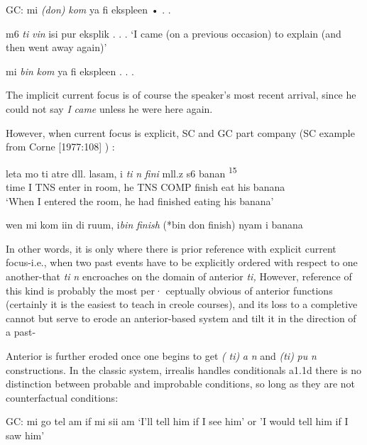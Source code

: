 \ea\label{ex:2:107}
 GC: mi \textit{(don)} \textit{k}\textit{om} ya fi ekspleen • . .
\glt
\z

\ea\label{ex:2:108}
 m6 \textit{ti} \textit{vin} isi pur eksplik . . .
\glt `I came (on a previous occasion) to explain (and then went away again)'
\z



\ea\label{ex:2:109}
 mi \textit{bin} \textit{kom} ya fi ekspleen . . .
\glt
\z

The implicit current focus is of course the speaker's most recent arrival, since he could not say \textit{I} \textit{came} unless he were here again.

However, when current focus is explicit, SC and GC part com\-pany (SC example from Corne [1977:108] ) :

\ea\label{ex:2:110}
\gll leta mo ti atre dll. lasam, i \textit{ti} \textit{n} \textit{fini }mll.z s6 banan \textsuperscript{15}\\
time I TNS enter in room, he TNS COMP finish eat his banana \\
\glt `When I entered the room, he had finished eating his banana'
\z

\ea\label{ex:2:111}
 wen mi kom iin di ruum, i\textit{bin} \textit{finish }(*bin don finish) nyam i banana\\
\z



In other words, it is only where there is prior reference with explicit current focus-i.e., when two past events have to be explicitly ordered with respect to one another-that \textit{ti} \textit{n} encroaches on the domain of anterior \textit{ti,} However, reference of this kind is probably the most per· ceptually obvious of anterior functions (certainly it is the easiest to teach in creole courses), and its loss to a completive cannot but serve
to erode an anterior-based system and tilt it in the direction of a past-


Anterior is further eroded once one begins to get \textit{(} \textit{ti)} \textit{a} \textit{n} and \textit{(ti)} \textit{pu} \textit{n} constructions. In the classic system, irrealis handles condi\-tionals a1.1d there is no distinction between probable and improbable conditions, so long as they are not counterfactual conditions:

\ea\label{ex:2:112}
 GC: mi go tel am if mi sii am
\glt `I'll tell him if I see him' or 'I would tell him if I saw him'
\z



